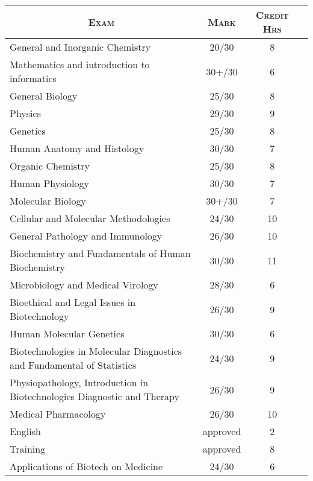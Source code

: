 \documentclass[a4paper,10pt]{article}
\begin{document}
\begin{center}
\begin{tabular}{lccc}
\multicolumn{1}{c}{\textsc{Exam}}&\textsc{Mark}&\textsc{Credit Hrs}\\ \hline
    General and Inorganic Chemistry	                        &20/30  &8\\
    Mathematics and introduction to informatics	            &30+/30  &6\\
    General Biology                                         & 25/30 &8 \\
    Physics                                                 & 29/30 &9 \\
    Genetics                                                & 25/30 &8 \\
    Human Anatomy and Histology                             & 30/30 &7 \\
    Organic Chemistry                                       & 25/30 &8 \\
    Human Physiology                                        & 30/30 &7 \\
    Molecular Biology                                       & 30+/30 &7 \\
    Cellular and Molecular Methodologies                    & 24/30 &10 \\
    General Pathology and Immunology                        & 26/30 &10 \\
    Biochemistry and Fundamentals of Human Biochemistry     & 30/30 &11 \\
    Microbiology and Medical Virology                       & 28/30 &6 \\
    Bioethical and Legal Issues in Biotechnology            & 26/30 &9 \\
    Human Molecular Genetics                                & 30/30 &6 \\
    Biotechnologies in Molecular Diagnostics and Fundamental of Statistics  & 24/30 &9 \\
    Physiopathology, Introduction in Biotechnologies Diagnostic and Therapy & 26/30 &9 \\
    Medical Pharmacology                                    & 26/30 &10 \\
    English                                                 & approved &2 \\
    Training                                                & approved &8 \\
    Applications of Biotech on Medicine                     & 24/30 &6 \\

\end{tabular}
\end{center}
\end{document}
